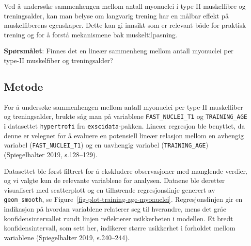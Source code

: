 \documentclass[
  letterpaper,
  DIV=11,
  numbers=noendperiod]{scrreprt}
\begin{document}
Ved å undersøke sammenhengen mellom antall myonuclei i type II
muskelfibre og treningsalder, kan man belyse om langvarig trening har en
målbar effekt på muskelfiberens egenskaper. Dette kan gi innsikt som er
relevant både for praktisk trening og for å forstå mekanismene bak
muskeltilpasning.

\textbf{Spørsmålet}: Finnes det en lineær sammenheng mellom antall
myonuclei per type-II muskelfiber og treningsalder?

\subsection{Metode}\label{metode-3}

For å undersøke sammenhengen mellom antall myonuclei per type-II
muskelfiber og treningsalder, brukte såg man på variablene
\texttt{FAST\_NUCLEI\_T1} og \texttt{TRAINING\_AGE} i datasettet
\texttt{hypertrofi} fra \texttt{exscidata}-pakken. Lineær regresjon ble
benyttet, da denne er velegnet for å evaluere en potensiell lineær
relasjon mellom en avhengig variabel (\texttt{FAST\_NUCLEI\_T1}) og en
uavhengig variabel (\texttt{TRAINING\_AGE}) (Spiegelhalter 2019,
s.128--129).

Datasettet ble først filtrert for å ekskludere observasjoner med
manglende verdier, og vi valgte kun de relevante variablene for
analysen. Dataene ble deretter visualisert med scatterplott og en
tilhørende regresjonslinje generert av \texttt{geom\_smooth}, se
Figure~\ref{fig-plot-training-age-myonuclei}. Regresjonslinjen gir en
indikasjon på hvordan variablene relaterer seg til hverandre, mens det
gråe konfidensintervallet rundt linjen reflekterer usikkerheten i
modellen. Et bredt konfidensintervall, som sett her, indikerer større
usikkerhet i forholdet mellom variablene (Spiegelhalter 2019,
s.240--244).
\end{document}

